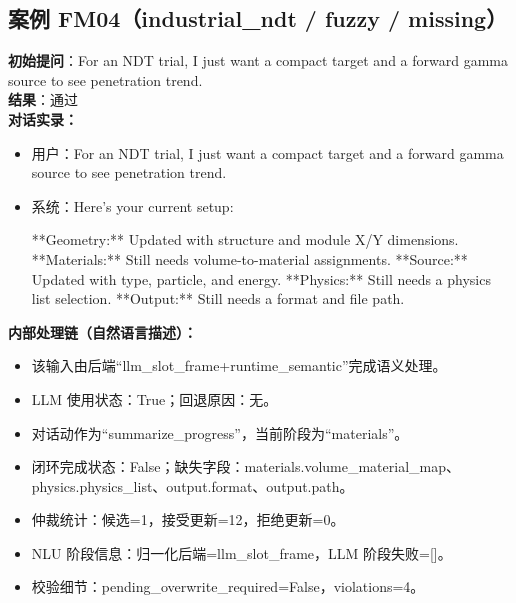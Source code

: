 \documentclass[11pt]{ctexart}
\begin{document}
\subsection{案例 FM04（industrial\_ndt / fuzzy / missing）}
\textbf{初始提问}：For an NDT trial, I just want a compact target and a forward gamma source to see penetration trend.\\
\textbf{结果}：通过\\
\textbf{对话实录：}
\begin{itemize}
\item 用户：For an NDT trial, I just want a compact target and a forward gamma source to see penetration trend.
\item 系统：Here's your current setup:

**Geometry:** Updated with structure and module X/Y dimensions.
**Materials:** Still needs volume-to-material assignments.
**Source:** Updated with type, particle, and energy.
**Physics:** Still needs a physics list selection.
**Output:** Still needs a format and file path.
\end{itemize}
\textbf{内部处理链（自然语言描述）：}
\begin{itemize}
\item 该输入由后端“llm\_slot\_frame+runtime\_semantic”完成语义处理。
\item LLM 使用状态：True；回退原因：无。
\item 对话动作为“summarize\_progress”，当前阶段为“materials”。
\item 闭环完成状态：False；缺失字段：materials.volume\_material\_map、physics.physics\_list、output.format、output.path。
\item 仲裁统计：候选=1，接受更新=12，拒绝更新=0。
\item NLU 阶段信息：归一化后端=llm\_slot\_frame，LLM 阶段失败=[]。
\item 校验细节：pending\_overwrite\_required=False，violations=4。
\end{itemize}
\end{document}
